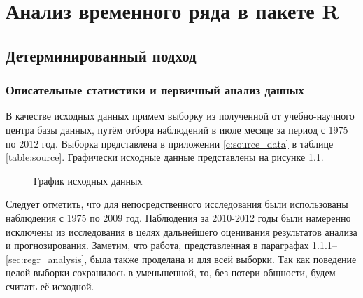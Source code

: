\newcommand{\inp}[1]{}
\newcommand{\characteristic}[2]{\inp{#1/characteristics/#2}}
\newcommand{\descriptive}[2]{\inp{#1/descriptive/#2}}
\newcommand{\test}[3]{\inp{#1/test/#2/#3}}
\newcommand{\normaldistr}{$\mathcal{N}(\descriptive{original}{mean}, \descriptive{original}{variance})$}

\newpage

\chapter{Анализ временного ряда в пакете R}

\section{Детерминированный подход} %
\label{sec:determenistic}

\subsection{Описательные статистики и первичный анализ данных} %
\label{sec:basis}

В качестве исходных данных примем выборку из полученной от учебно-научного центра базы данных, путём отбора наблюдений в июле месяце за период с 1975 по 2012 год. Выборка представлена в приложении \ref{c:source_data} в таблице \ref{table:source}. Графически исходные данные представлены на рисунке \ref{img:input}.

\begin{figure}[ht]
\caption{График исходных данных}
\label{img:input}
\end{figure}

Следует отметить, что для непосредственного исследования были использованы наблюдения с 1975 по 2009 год. Наблюдения за 2010-2012 годы были намеренно исключены из исследования в целях дальнейшего оценивания результатов анализа и прогнозирования. Заметим, что работа, представленная в параграфах \ref{sec:basis}--\ref{sec:regr_analysis}, была также проделана и для всей выборки. Так как поведение целой выборки сохранилось в уменьшенной, то, без потери общности, будем считать её исходной.

